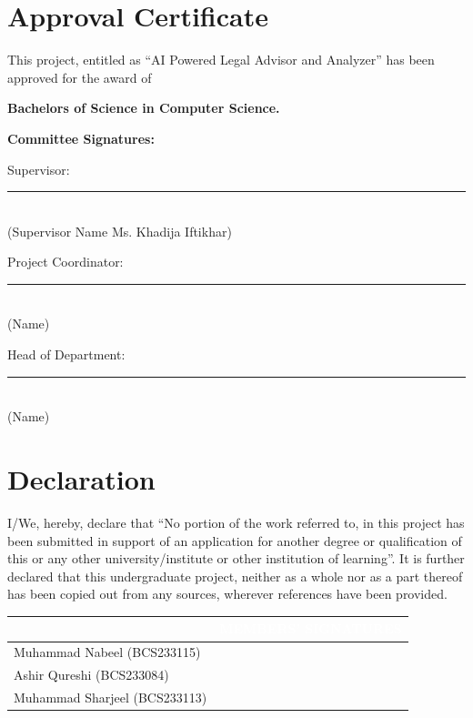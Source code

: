 \documentclass[12pt,a4paper]{report}
\renewcommand{\arraystretch}{1.3}
\begin{document}
\chapter*{Approval Certificate}
\begin{center}
This project, entitled as ``AI Powered Legal Advisor and Analyzer'' has been approved for the award of\par
\vspace{14pt}
{\Large\bfseries Bachelors of Science in Computer Science.\par}
\end{center}
\vspace{10pt}
{\small\bfseries Committee Signatures:}\par
\vspace{30pt}
\newcommand{\signline}[2]{%
  \noindent\begin{minipage}[t]{0.5\textwidth}#1\end{minipage}%
  \begin{minipage}[t]{0.45\textwidth}\vspace{8pt}\rule{\linewidth}{0.4pt}\\[-2pt]{\scriptsize #2}\end{minipage}\par\vspace{36pt}}
\signline{Supervisor:}{(Supervisor Name Ms. Khadija Iftikhar)}
\signline{Project Coordinator:}{(Name)}
\signline{Head of Department:}{(Name)}
\clearpage

\chapter*{Declaration}
I/We, hereby, declare that ``No portion of the work referred to, in this project has been submitted in support of an application for another degree or qualification of this or any other university/institute or other institution of learning''. It is further declared that this undergraduate project, neither as a whole nor as a part thereof has been copied out from any sources, wherever references have been provided.

\vspace{40pt}
\begin{center}
\renewcommand{\arraystretch}{1.8}
\begin{tabular}{|p{6.9cm}|p{6.9cm}|}
\hline
\rowcolor{black}\multicolumn{1}{|c|}{\textcolor{white}{\small\bfseries MEMBER NAME}} & \multicolumn{1}{c|}{\textcolor{white}{\small\bfseries MEMBERS' SIGNATURES}} \\ \hline
Muhammad Nabeel (BCS233115) \rule[-0.45cm]{0pt}{1.15cm} & \\ \hline
Ashir Qureshi (BCS233084) \rule[-0.45cm]{0pt}{1.15cm} & \\ \hline
Muhammad Sharjeel (BCS233113) \rule[-0.45cm]{0pt}{1.15cm} & \\ \hline
\end{tabular}
\end{center}
\clearpage
\end{document}
